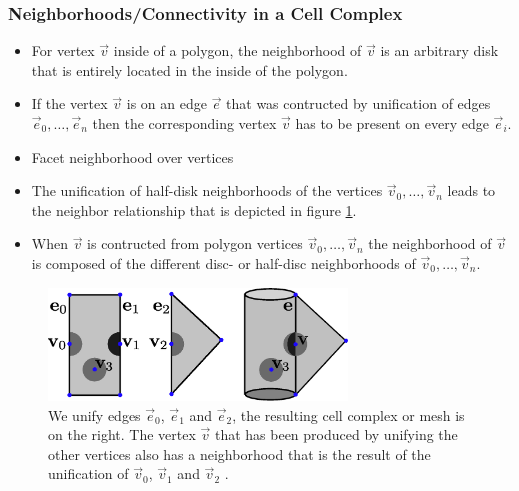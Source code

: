 \begin{frame}
  \vspace{-1cm}
  \frametitle{Neighborhoods/Connectivity in a Cell Complex}
		\begin{itemize}
			\item For vertex $\vec{v}$ inside of a polygon, the neighborhood of $\vec{v}$ is an arbitrary disk that is entirely located in the inside 
of the polygon. 
			\item If the vertex $\vec{v}$ is on an edge $\vec{e}$ that was contructed by unification of edges $\vec{e}_0,\dots,\vec{e}_n$ then the corresponding vertex $\vec{v}$ has to be present on every edge $\vec{e}_i$.
			\item Facet neighborhood over vertices
			\item The unification of half-disk neighborhoods of the vertices $\vec{v}_0,\dots,\vec{v}_n$ leads to the neighbor relationship that is
depicted in figure \ref{fig:mesh-neighborhood}.
			\item When $\vec{v}$ is contructed from polygon vertices $\vec{v}_0,\dots,\vec{v}_n$ the neighborhood of $\vec{v}$ is composed of the different disc- or half-disc neighborhoods of $\vec{v}_0,\dots, \vec{v}_n$.  
		\end{itemize}					 
\begin{figure}[h!]
\begin{center}
\includegraphics[height=3cm]{screenshots/neighborhood.eps}
\end{center}
\caption{We unify edges $\vec{e}_0$, $\vec{e}_1$ and $\vec{e}_2$, the resulting cell complex or mesh is on the right. The vertex $\vec{v}$ that has been produced by
unifying the other vertices also has a neighborhood that is the result of the unification of $\vec{v}_0$, $\vec{v}_1$ and $\vec{v}_2$ \cite{kinsey1993topology}.}
\label{fig:mesh-neighborhood}
\end{figure}

\end{frame}

